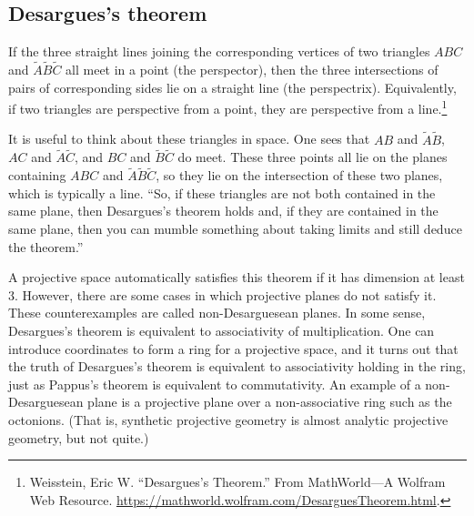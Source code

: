 \documentclass [11 pt, oneside] {article}
\begin{document}
\subsection{Desargues's theorem}
\begin{theorem}[Desargues]\label{}
If the three straight lines joining the corresponding vertices of two triangles $ABC$ and $\tilde A\tilde B\tilde C$ all meet in a point (the perspector), then the three intersections of pairs of corresponding sides lie on a straight line (the perspectrix). Equivalently, if two triangles are perspective from a point, they are perspective from a line.\footnote{Weisstein, Eric W. ``Desargues's Theorem.'' From {MathWorld}---A Wolfram Web Resource. \url{https://mathworld.wolfram.com/DesarguesTheorem.html}.}
\end{theorem}

It is useful to think about these triangles in space. One sees that $AB$ and $\tilde A\tilde B$, $AC$ and $\tilde A\tilde C$, and $BC$ and $\tilde B\tilde C$ do meet. These three points all lie on the planes containing $ABC$ and $\tilde A\tilde B\tilde C$, so they lie on the intersection of these two planes, which is typically a line. ``So, if these triangles are not both contained in the same plane, then Desargues's theorem holds and, if they are contained in the same plane, then you can mumble something about taking limits and still deduce the theorem.''

A projective space automatically satisfies this theorem if it has dimension at least $3$. However, there are some cases in which projective planes do not satisfy it. These counterexamples are called non-Desarguesean planes. In some sense, Desargues's theorem is equivalent to associativity of multiplication. One can introduce coordinates to form a ring for a projective space, and it turns out that the truth of Desargues's theorem is equivalent to associativity holding in the ring, just as Pappus's theorem is equivalent to commutativity. An example of a non-Desarguesean plane is a projective plane over a non-associative ring such as the octonions. (That is, synthetic projective geometry is almost analytic projective geometry, but not quite.)
\end{document}
